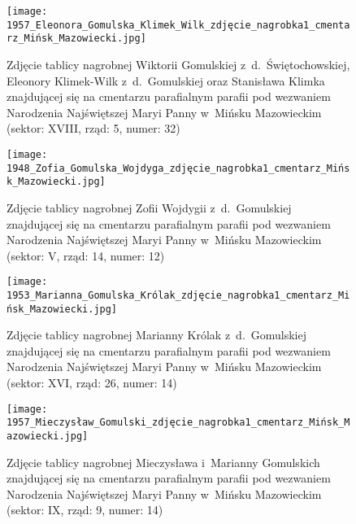 \begin{figure}[!ht]
    \vspace*{0.4cm}
    \centering \texttt{[image: 
        1957\_Eleonora\_Gomulska\_Klimek\_Wilk\_zdjęcie\_nagrobka1\_cmentarz\_Mińsk\_Mazowiecki.jpg]}
    \captionsetup{format=hang}
    \caption{Zdjęcie tablicy nagrobnej Wiktorii Gomulskiej 
    z~d.~Świętochowskiej, Eleonory Klimek-Wilk z~d.~Gomulskiej oraz Stanisława
    Klimka znajdującej się na cmentarzu parafialnym parafii pod wezwaniem
    Narodzenia Najświętszej Maryi Panny w~Mińsku Mazowieckim (sektor: XVIII,
    rząd: 5, numer: 32)}
    \label{fig:wgomulska_1957}
\end{figure}

\begin{figure}[!ht]
    \vspace*{0.4cm}
    \centering \texttt{[image: 
        1948\_Zofia\_Gomulska\_Wojdyga\_zdjęcie\_nagrobka1\_cmentarz\_Mińsk\_Mazowiecki.jpg]}
    \captionsetup{format=hang}
    \caption{Zdjęcie tablicy nagrobnej Zofii Wojdygii z~d.~Gomulskiej
    znajdującej się na cmentarzu parafialnym parafii pod wezwaniem Narodzenia
    Najświętszej Maryi Panny w~Mińsku Mazowieckim (sektor: V, rząd: 14,
    numer: 12)}
    \label{fig:zgomulska_1948}
\end{figure}

\begin{figure}[!ht]
    \vspace*{0.4cm}
    \centering \texttt{[image: 
        1953\_Marianna\_Gomulska\_Królak\_zdjęcie\_nagrobka1\_cmentarz\_Mińsk\_Mazowiecki.jpg]}
    \captionsetup{format=hang}
    \caption{Zdjęcie tablicy nagrobnej Marianny Królak z~d.~Gomulskiej
    znajdującej się na cmentarzu parafialnym parafii pod wezwaniem Narodzenia
    Najświętszej Maryi Panny w~Mińsku Mazowieckim (sektor: XVI, rząd: 26,
    numer: 14)}
    \label{fig:mgomulska_1953}
\end{figure}

\begin{figure}[!ht]
    \vspace*{0.4cm}
    \centering \texttt{[image: 
        1957\_Mieczysław\_Gomulski\_zdjęcie\_nagrobka1\_cmentarz\_Mińsk\_Mazowiecki.jpg]}
    \captionsetup{format=hang}
    \caption{Zdjęcie tablicy nagrobnej Mieczysława i~Marianny Gomulskich
    znajdującej się na cmentarzu parafialnym parafii pod wezwaniem Narodzenia
    Najświętszej Maryi Panny w~Mińsku Mazowieckim (sektor: IX, rząd: 9,
    numer: 14)}
    \label{fig:mgomulski_1957}
\end{figure}

